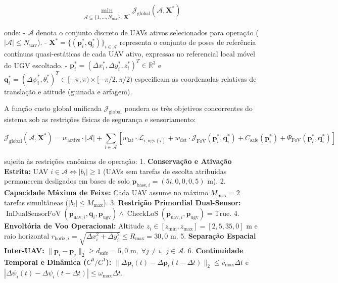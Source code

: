 \documentclass[
  brazilian,
  a4paper]{article}
\begin{document}
\[\min_{\mathcal{A} \subseteq \{1, \dots, N_{\text{uav}}\}, \; \mathbf{X}^*} \mathcal{J}_{\text{global}}(\mathcal{A}, \mathbf{X}^*)\]

onde: - \(\mathcal{A}\) denota o conjunto discreto de UAVs ativos
selecionados para operação (\(|\mathcal{A}| \le N_{\text{uav}}\)). -
\(\mathbf{X}^* = \{(\mathbf{p}_i^*, \mathbf{q}_i^*)\}_{i \in \mathcal{A}}\)
representa o conjunto de poses de referência contínuas quasi-estáticas
de cada UAV ativo, expressas no referencial local móvel do UGV
escoltado. -
\(\mathbf{p}_i^* = (\Delta x_i^*, \Delta y_i^*, z_i^*)^T \in \mathbb{R}^3\)
e
\(\mathbf{q}_i^* = (\Delta \psi_i^*, \theta_i^*)^T \in [-\pi, \pi) \times [-\pi/2, \pi/2)\)
especificam as coordenadas relativas de translação e atitude (guinada e
arfagem).

A função custo global unificada \(\mathcal{J}_{\text{global}}\) pondera
os três objetivos concorrentes do sistema sob as restrições físicas de
segurança e sensoriamento:

\[\mathcal{J}_{\text{global}}(\mathcal{A}, \mathbf{X}^*) = w_{\text{active}} \cdot |\mathcal{A}| + \sum_{i \in \mathcal{A}} \left[ w_{\text{lat}} \cdot \mathcal{L}_{i, \text{ugv}(i)} + w_{\text{det}} \cdot \mathcal{J}_{\text{FoV}}(\mathbf{p}_i^*, \mathbf{q}_i^*) + C_{\text{safe}}(\mathbf{p}_i^*) + \Psi_{\text{FoV}}(\mathbf{p}_i^*, \mathbf{q}_i^*) \right]\]

sujeita às restrições canônicas de operação: 1. \textbf{Conservação e
Ativação Estrita:} UAV \(i \in \mathcal{A} \iff |b_i| \ge 1\) (UAVs sem
tarefas de escolta atribuídas permanecem desligados em bases de solo
\(\mathbf{p}_{\text{base}, i} = (5i, 0{,}0, 0{,}5)\text{ m}\)). 2.
\textbf{Capacidade Máxima de Feixe:} Cada UAV assume no máximo
\(M_{\text{max}} = 2\) tarefas simultâneas
(\(|b_i| \le M_{\text{max}}\)). 3. \textbf{Restrição Primordial
Dual-Sensor:}
\(\operatorname{InDualSensorFoV}(\mathbf{p}_{\text{uav}, i}, \mathbf{q}_i, \mathbf{p}_{\text{ugv}}) \land \operatorname{CheckLoS}(\mathbf{p}_{\text{uav}, i}, \mathbf{p}_{\text{ugv}}) = \text{True}\).
4. \textbf{Envoltória de Voo Operacional:} Altitude
\(z_i \in [z_{\text{min}}, z_{\text{max}}] = [2{,}5, 35{,}0]\text{ m}\)
e raio horizontal
\(r_{\text{horiz}, i} = \sqrt{\Delta x_i^2 + \Delta y_i^2} \le R_{\text{max}} = 30{,}0\text{ m}\).
5. \textbf{Separação Espacial Inter-UAV:}
\(\|\mathbf{p}_i - \mathbf{p}_j\|_2 \ge d_{\text{safe}} = 5{,}0\text{ m}, \; \forall j \ne i, \; j \in \mathcal{A}\).
6. \textbf{Continuidade Temporal e Dinâmica (\(C^0 / C^1\)):}
\(\|\Delta \mathbf{p}_i(t) - \Delta \mathbf{p}_i(t - \Delta t)\|_2 \le v_{\text{max}} \Delta t\)
e
\(|\Delta \psi_i(t) - \Delta \psi_i(t - \Delta t)| \le \omega_{\text{max}} \Delta t\).
\end{document}
